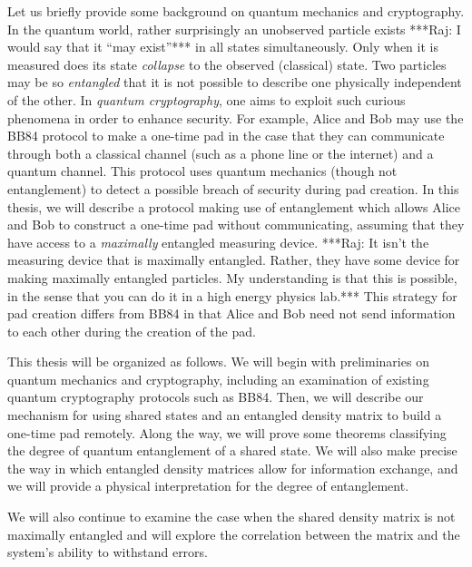 Let us briefly provide some background on quantum mechanics and cryptography.  In the quantum world, rather surprisingly an unobserved particle exists ***Raj: I would say that it ``may exist''*** in all states simultaneously.  Only when it is measured does its state {\emph{collapse}} to the observed (classical) state.  Two particles may be so {\emph{entangled}} that it is not possible to describe one physically independent of the other.  In {\emph{quantum cryptography}}, one aims to exploit such curious phenomena in order to enhance security.  For example, Alice and Bob may use the BB84 protocol to make a one-time pad in the case that they can communicate through both a classical channel (such as a phone line or the internet) and a quantum channel. This protocol uses quantum mechanics (though not entanglement) to detect a possible breach of security during pad creation.  In this thesis, we will describe a protocol making use of entanglement which allows Alice and Bob to construct a one-time pad without communicating, assuming that they have access to a {\emph{maximally}} entangled measuring device.  ***Raj: It isn't the measuring device that is maximally entangled. Rather, they have some device for making maximally entangled particles. My understanding is that this is possible, in the sense that you can do it in a high energy physics lab.*** This strategy for pad creation differs from BB84 in that Alice and Bob need not send information to each other during the creation of the pad.

This thesis will be organized as follows.  We will begin with preliminaries on quantum mechanics and cryptography, including an examination of existing quantum cryptography protocols such as BB84. Then, we will describe our mechanism for using shared states and an entangled density matrix to build a one-time pad remotely. Along the way, we will prove some theorems classifying the degree of quantum entanglement of a shared state. We will also make precise the way in which entangled density matrices allow for information exchange, and we will provide a physical interpretation for the degree of entanglement. 

We will also continue to examine the case when the shared density matrix is not maximally entangled and will explore the correlation between the matrix and the system's ability to withstand errors. 
